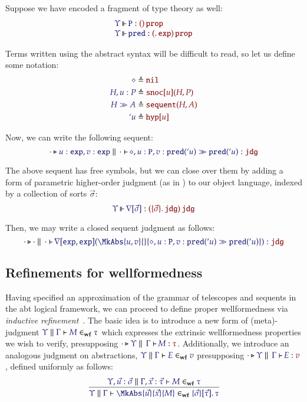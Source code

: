 Suppose we have encoded a fragment of type theory as well:
\[
  \begin{array}{l}
    \IsOperator{\Upsilon}{\mathtt{P}}{
      \MkArity{}{\SortProp}
    }
\\
    \IsOperator{\Upsilon}{\mathtt{pred}}{
      \MkArity{
        \MkValence{}{}{\SortExp}
      }{\SortProp}
    }
\\
  \end{array}
\]

Terms written using the abstract syntax will be difficult to read, so let us
define some notation:
\begin{align*}
  \IMode{\diamond}
&
  \triangleq \OMode{\OpNil}
\\
  \IMode{H, u:P}
&
  \triangleq \OMode{
    \App{\OpSnoc{u}}{H, P}
  }
\\
  \IMode{H\gg A}
&
  \triangleq \OMode{
    \App{\OpSequent}{
      H, A
    }
  }
\\
  \IMode{`u}
&
  \triangleq \OMode{\OpHyp{u}}
\end{align*}

Now, we can write the following sequent:
\[
  \IsAbt{\cdot}{
    u:\SortExp,
    v:\SortExp
  }{\cdot}{
    \diamond,u:\mathtt{P},v:\App{\mathtt{pred}}{`u}
    \gg
    \App{\mathtt{pred}}{`u}
  }{\SortJdg}
\]

\newcommand\OpNabla[1]{\nabla[#1]}

The above sequent has free symbols, but we can close over them by adding a form
of parametric higher-order judgment (as in \cite{harper:2016}) to our object
language, indexed by a collection of sorts $\vec{\sigma}$:
\[
  \IsOperator{\Upsilon}{\OpNabla{\vec{\sigma}}}{
    \MkArity{
      \MkValence{\vec{\sigma}}{}{\SortJdg}
    }{\SortJdg}
  }
\]

Then, we may write a closed sequent judgment as follows:
\[
  \IsAbt{\cdot}{\cdot}{\cdot}{
    \App{\OpNabla{\SortExp,\SortExp}}{
      \MkAbs{u,v}{}{
        \diamond,u:\mathtt{P},v:\App{\mathtt{pred}}{`u}
        \gg
        \App{\mathtt{pred}}{`u}
      }
    }
  }{\SortJdg}
\]

\subsection{Refinements for wellformedness}

Having specified an approximation of the grammar of telescopes and sequents in
the abt logical framework, we can proceed to define proper wellformedness via
\emph{inductive refinement}~\cite{harper:2016}. The basic idea is to introduce a
new form of (meta)-judgment $\IsWf{\Upsilon}{\Gamma}{M}{\tau}$ which
expresses the extrinsic wellformedness properties we wish to verify,
presupposing $\IsAbt{\cdot}{\Upsilon}{\Gamma}{M}{\tau}$. Additionally, we
introduce an analogous judgment on abstractions,
$\IsWf{\Upsilon}{\Gamma}{E}{v}$ presupposing
$\IsAbt{\cdot}{\Upsilon}{\Gamma}{E}{v}$, defined uniformly as follows:
\[
  \infer{
    \IsWf{\Upsilon}{\Gamma}{
      \MkAbs{\vec{u}}{\vec{x}}{M}
    }{
      \MkValence{\vec{\sigma}}{\vec{\tau}}{\tau}
    }
  }{
    \IsWf{\Upsilon,\vec{u}:\vec{\sigma}}{\Gamma,\vec{x}:\vec{\tau}}{M}{\tau}
  }
\]


